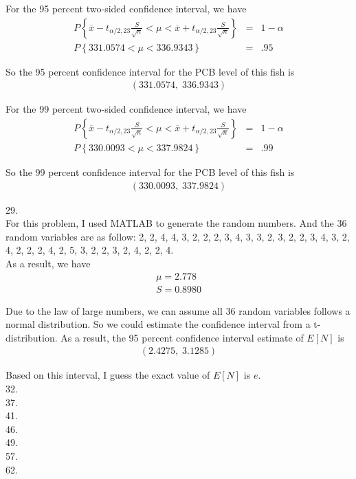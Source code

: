 \documentclass[12pt]{article}
\begin{document}
For the 95 percent two-sided confidence interval, we have
\begin{eqnarray*}
  P \left\{ \overline{x} - t_{\alpha / 2, 23} \frac {S}{\sqrt{n}} < \mu
    < \overline{x} + t_{\alpha / 2, 23} \frac {S}{\sqrt{n}}
  \right\} &=& 1 - \alpha \\
  P \left\{ 331.0574 < \mu < 336.9343 \right\} &=& .95
\end{eqnarray*}

So the 95 percent confidence interval for the PCB level of this fish is
\begin{eqnarray*}
  \left( 331.0574, \; 336.9343 \right)
\end{eqnarray*}

For the 99 percent two-sided confidence interval, we have
\begin{eqnarray*}
  P \left\{ \overline{x} - t_{\alpha / 2, 23} \frac {S}{\sqrt{n}} < \mu
    < \overline{x} + t_{\alpha / 2, 23} \frac {S}{\sqrt{n}}
  \right\} &=& 1 - \alpha \\
  P \left\{ 330.0093 < \mu < 337.9824 \right\} &=& .99
\end{eqnarray*}

So the 99 percent confidence interval for the PCB level of this fish is
\begin{eqnarray*}
  \left( 330.0093, \; 337.9824 \right)
\end{eqnarray*}

29. \\

For this problem, I used MATLAB to generate the random numbers. And the 36 random variables are as follow: 2, 2, 4, 4, 3, 2, 2, 2, 3, 4, 3, 3, 2, 3, 2, 2, 3, 4, 3, 2, 4, 2, 2, 2, 4, 2, 5, 3, 2, 2, 3, 2, 4, 2, 2, 4. \\

As a result, we have
\begin{eqnarray*}
  \mu = 2.778 \\
  S = 0.8980
\end{eqnarray*}

Due to the law of large numbers, we can assume all 36 random variables follows a normal distribution. So we could estimate the confidence interval from a t-distribution. As a result, the 95 percent confidence interval estimate of $E[N]$ is
\begin{eqnarray*}
  \left( 2.4275, \; 3.1285 \right)
\end{eqnarray*}

Based on this interval, I guess the exact value of $E[N]$ is $e$. \\

32. \\






37. \\


41. \\


46. \\


49. \\


57. \\



62. \\
\end{document}
